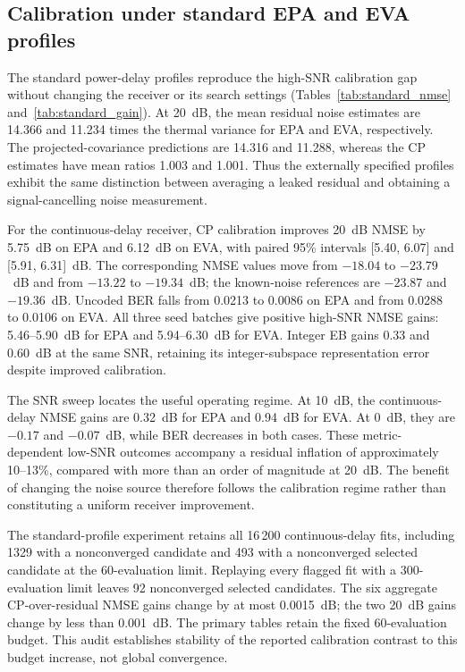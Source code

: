 \subsection{Calibration under standard EPA and EVA profiles}
\label{sec:standard_results}
The standard power-delay profiles reproduce the high-SNR calibration gap
without changing the receiver or its search settings
(Tables~\ref{tab:standard_nmse} and~\ref{tab:standard_gain}). At 20~dB,
the mean residual noise estimates are 14.366 and 11.234 times the thermal
variance for EPA and EVA, respectively. The projected-covariance predictions
are 14.316 and 11.288, whereas the CP estimates have mean ratios 1.003 and
1.001. Thus the externally specified profiles exhibit the same distinction
between averaging a leaked residual and obtaining a signal-cancelling
noise measurement.

For the continuous-delay receiver, CP calibration improves 20~dB NMSE by
5.75~dB on EPA and 6.12~dB on EVA, with paired 95\% intervals
[5.40, 6.07] and [5.91, 6.31]~dB. The corresponding NMSE values move from
$-18.04$ to $-23.79$~dB and from $-13.22$ to $-19.34$~dB; the known-noise
references are $-23.87$ and $-19.36$~dB. Uncoded BER falls from 0.0213 to
0.0086 on EPA and from 0.0288 to 0.0106 on EVA. All three seed batches
give positive high-SNR NMSE gains: 5.46--5.90~dB for EPA and 5.94--6.30~dB
for EVA. Integer EB gains 0.33 and 0.60~dB at the same SNR, retaining its
integer-subspace representation error despite improved calibration.

The SNR sweep locates the useful operating regime. At 10~dB, the
continuous-delay NMSE gains are 0.32~dB for EPA and 0.94~dB for EVA. At
0~dB, they are $-0.17$ and $-0.07$~dB, while BER decreases in both cases.
These metric-dependent low-SNR outcomes accompany a residual inflation of
approximately 10--13\%, compared with more than an order of magnitude at
20~dB. The benefit of changing the noise source therefore follows the
calibration regime rather than constituting a uniform receiver improvement.



The standard-profile experiment retains all 16\,200 continuous-delay fits,
including 1329 with a nonconverged candidate and 493 with a nonconverged
selected candidate at the 60-evaluation limit. Replaying every flagged fit
with a 300-evaluation limit leaves 92 nonconverged selected candidates.
The six aggregate CP-over-residual NMSE gains change by at most 0.0015~dB;
the two 20~dB gains change by less than 0.001~dB. The primary tables retain
the fixed 60-evaluation budget. This audit establishes stability of the
reported calibration contrast to this budget increase, not global convergence.
